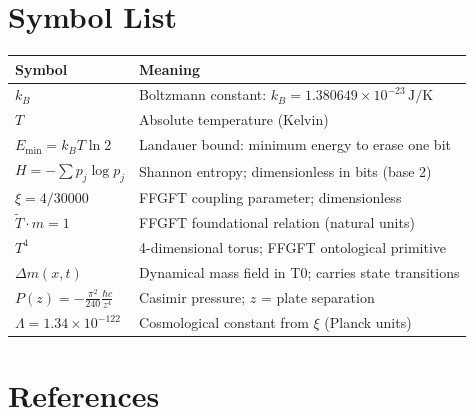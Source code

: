 \section{Symbol List}

{\small
\begin{tabular}{p{3.5cm}p{9.5cm}}
\toprule
\textbf{Symbol} & \textbf{Meaning} \\
\midrule
$k_B$ & Boltzmann constant: $k_B = 1.380649 \times 10^{-23}\,\text{J/K}$ \\
$T$ & Absolute temperature (Kelvin) \\
$E_{\min} = k_B T \ln 2$ & Landauer bound: minimum energy to erase one bit \\
$H = -\sum p_j \log p_j$ & Shannon entropy; dimensionless in bits (base 2) \cite{Shannon1948} \\
$\xi = 4/30000$ & FFGFT coupling parameter; dimensionless \\
$\tilde{T} \cdot m = 1$ & FFGFT foundational relation (natural units) \\
$T^4$ & 4-dimensional torus; FFGFT ontological primitive \\
$\Delta m(x,t)$ & Dynamical mass field in T0; carries state transitions \\
$P(z) = -\frac{\pi^2}{240}\frac{\hbar c}{z^4}$ & Casimir pressure; $z$ = plate separation \cite{Casimir1948} \\
$\Lambda = 1.34 \times 10^{-122}$ & Cosmological constant from $\xi$ (Planck units) \cite{Pascher_182} \\
\bottomrule
\end{tabular}
}

\section*{References}

